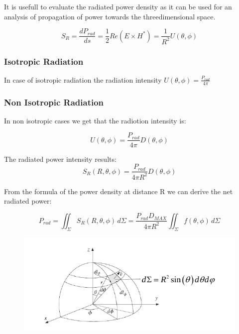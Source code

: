 It is usefull to evaluate the radiated power density as it can be used for an analysis of propagation of power towards the threedimensional space.

\begin{equation}
	S_R=\frac{dP_{rad}}{ds}=\frac{1}{2}Re(E\times H^*)=\frac{1}{R^2}\textit{U}(\theta,\phi)
\end{equation}

\subsubsection*{Isotropic Radiation}

In case of isotropic radiation the radiation intensity $\textit{U}(\theta,\phi)= \frac{P_{rad}}{4\pi}$ 

\subsubsection*{Non Isotropic Radiation}

In non isotropic cases we get that the radiotion intensity is:

\begin{equation}
\textit{U}(\theta,\phi)= \frac{P_{rad}}{4\pi} \textit{D}(\theta, \phi)
\end{equation}


The radiated power intensity results:
\begin{equation}
S_R(R,\theta,\phi)= \frac{P_{rad}}{4\pi R^2} \textit{D}(\theta, \phi)
\end{equation}

From the formula of the power density at distance R we can derive the net radiated power:

\begin{equation}
	P_{rad}= \iint_{\Sigma} S_R(R, \theta, \phi)\, d\Sigma = \frac{P_{rad}D_{MAX}}{4 \pi R^2}\iint_{\Sigma} f(\theta, \phi) \, d\Sigma
\end{equation}


\begin{figure}[h]
	\centering
	\includegraphics[scale=0.6]{Immagini/sph}	
	\label{fig:sph}
\end{figure}

